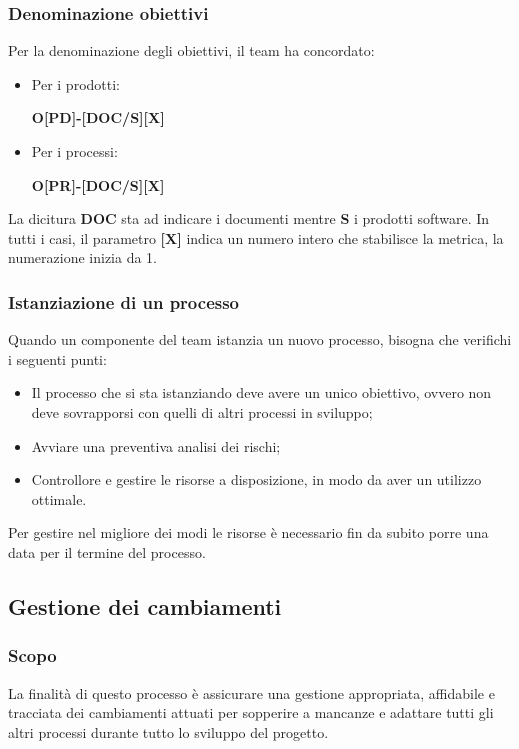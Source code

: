 \subsubsection{Denominazione obiettivi}
Per la denominazione degli obiettivi, il team ha concordato:
\begin{itemize}
    \item Per i prodotti:
          \begin{center}
              \textbf{O[PD]-[DOC/S][X]}
          \end{center}
    \item Per i processi:
          \begin{center}
              \textbf{O[PR]-[DOC/S][X]}
          \end{center}
\end{itemize}
La dicitura \textbf{DOC} sta ad indicare i documenti mentre \textbf{S} i prodotti software.
In tutti i casi, il parametro \textbf{[X]} indica un numero intero che stabilisce la metrica, la numerazione inizia da 1.

\subsubsection{Istanziazione di un processo}
Quando un componente del team istanzia un nuovo processo, bisogna che verifichi i seguenti punti:
\begin{itemize}
    \item Il processo che si sta istanziando deve avere un unico obiettivo,  ovvero non deve sovrapporsi con quelli di altri processi  in sviluppo;
    \item Avviare una preventiva analisi dei rischi;
    \item Controllore e gestire le risorse a disposizione, in modo da aver un utilizzo ottimale.
\end{itemize}
Per gestire nel migliore dei modi le risorse è necessario fin da subito porre una data per il termine del processo.

\subsection{Gestione dei cambiamenti} \label{_gestioneDeiCambiamenti}
\subsubsection{Scopo}
La finalità di questo processo è assicurare una gestione appropriata, affidabile e tracciata
dei cambiamenti attuati per sopperire a mancanze e adattare tutti gli altri processi durante tutto lo sviluppo del progetto.

